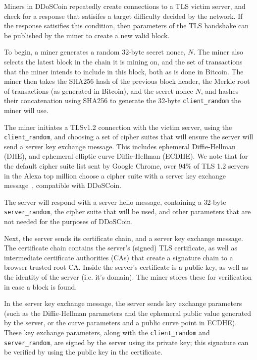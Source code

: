 Miners in DDoSCoin repeatedly create connections to a TLS victim server, and
check for a response that satisifes a target difficulty decided by the network.
If the response satisifies this condition, then parameters of the TLS handshake
can be published by the miner to create a new valid block.

To begin, a miner generates a random 32-byte secret nonce, $N$. The miner also
selects the latest block in the chain it is mining on, and the set of
transactions that the miner intends to include in this block, both as is done in
Bitcoin. The miner then takes the SHA256 hash of the previous block header, the
Merkle root of transactions (as generated in Bitcoin), and the secret nonce $N$,
and hashes their concatenation using SHA256 to generate the
32-byte \texttt{client\_random} the miner will use.

The miner initiates a TLSv1.2 connection with the victim server, using the
\texttt{client\_random}, and choosing a set of cipher suites that will ensure
the server will send a server key exchange message. This includes ephemeral
Diffie-Hellman (DHE), and ephemeral elliptic curve Diffie-Hellman (ECDHE). We
note that for the default cipher suite list sent by Google Chrome, over 94\%
of TLS 1.2 servers in the Alexa top million choose a cipher suite with a server key exchange
message~\cite{censys}, compatible with DDoSCoin.


The server will respond with a server hello message, containing a 32-byte
\texttt{server\_random}, the cipher suite that will be used, and other
parameters that are not needed for the purposes of DDoSCoin.

Next, the server sends its certificate chain, and a server key exchange message.
The certificate chain contains the server's (signed) TLS certificate, as well as
intermediate certificate authorities (CAs) that create a signature chain to a
browser-trusted root CA. Inside the server's certificate is a public
key, as well as the identity of the server (i.e. it's domain). The miner stores
these for verification in case a block is found.

In the server key exchange message, the server sends key exchange parameters
(such as the Diffie-Hellman parameters and the ephemeral public value generated
by the server, or the curve parameters and a public curve point in ECDHE). These
key exchange parameters, along with the \texttt{client\_random} and
\texttt{server\_random},  are signed by the server using its private key; this
signature can be verified by using the public key in the certificate.

